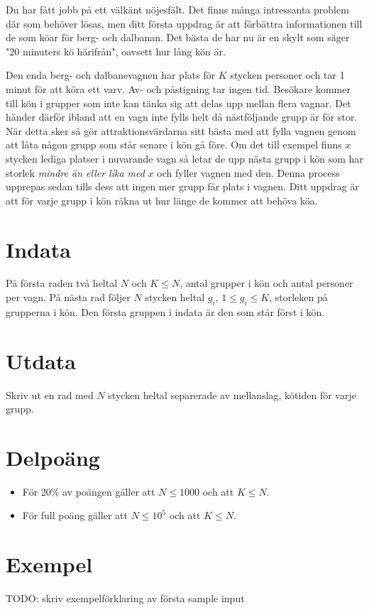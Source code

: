 Du har fått jobb på ett välkänt nöjesfält. Det finns många intressanta problem där som behöver lösas, men ditt första uppdrag är att förbättra informationen till de som köar för berg- och dalbanan. Det bästa de har nu är en skylt som säger "20 minuters kö härifrån", oavsett hur lång kön är.

Den enda berg- och dalbanevagnen har plats för $K$ stycken personer och tar 1 minut för att köra ett varv. Av- och påstigning tar ingen tid. Besökare kommer till kön i grupper som inte kan tänka sig att delas upp mellan flera vagnar. Det händer därför ibland att en vagn inte fylls helt då nästföljande grupp är för stor. När detta sker så gör attraktionsvärdarna sitt bästa med att fylla vagnen genom att låta någon grupp som står senare i kön gå före. Om det till exempel finns $x$ stycken lediga platser i nuvarande vagn så letar de upp nästa grupp i kön som har storlek \emph{mindre än eller lika med} $x$ och fyller vagnen med den. Denna process upprepas sedan tills dess att ingen mer grupp får plats i vagnen. Ditt uppdrag är att för varje grupp i kön räkna ut hur länge de kommer att behöva köa.

\section*{Indata}
På första raden två heltal $N$ och $K \leq N$, antal grupper i kön och antal personer per vagn. På nästa rad följer $N$ stycken heltal $g_i$, $1 \leq g_i \leq K$, storleken på grupperna i kön. Den första gruppen i indata är den som står först i kön.

\section*{Utdata}
Skriv ut en rad med $N$ stycken heltal separerade av mellanslag, kötiden för varje grupp.

\section*{Delpoäng}
\begin{itemize}
\item För 20\% av poängen gäller att $N \leq 1000$ och att $K \leq N$.
\item För full poäng gäller att $N \leq 10^{5}$ och att $K \leq N$.
\end{itemize}

\section*{Exempel}
TODO: skriv exempelförklaring av första sample input

